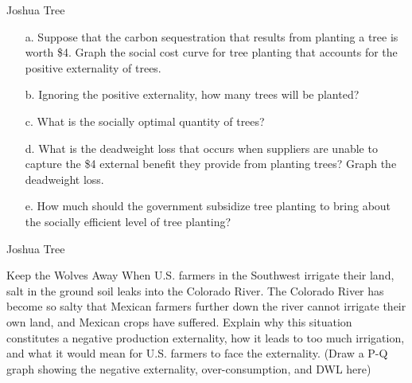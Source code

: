 \documentclass{beamer}
\begin{document}
\begin{frame}[t]{Joshua Tree}
    \begin{itemize}
        \item[a.] Suppose that the carbon sequestration that results from planting a tree is worth \$4. Graph the social cost curve for tree planting that accounts for the positive externality of trees.
        \item[b.] Ignoring the positive externality, how many trees will be planted?
        \item[c.] What is the socially optimal quantity of trees?
        \item[d.] What is the deadweight loss that occurs when suppliers are unable to capture the \$4 external benefit they provide from planting trees? Graph the deadweight loss.
        \item[e.] How much should the government subsidize tree planting to bring about the socially efficient level of tree planting?
    \end{itemize}
\end{frame}

\begin{frame}{Joshua Tree}
    \begin{center}
    \end{center}
\end{frame}

\begin{frame}{Keep the Wolves Away}
    When U.S. farmers in the Southwest irrigate their land, salt in the ground soil leaks into the Colorado River. The Colorado River has become so salty that Mexican farmers further down the river cannot irrigate their own land, and Mexican crops have suffered. Explain why this situation constitutes a negative production externality, how it leads to too much irrigation, and what it would mean for U.S. farmers to face the externality. (Draw a P-Q graph showing the negative externality, over-consumption, and DWL here)
\end{frame}
\end{document}
